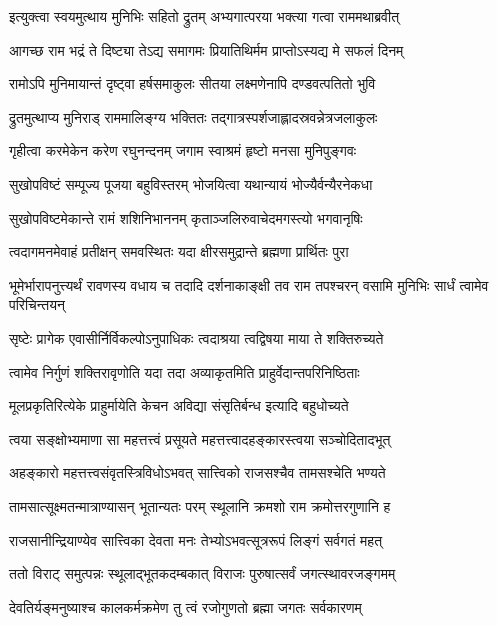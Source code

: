\twolineshloka
{इत्युक्त्वा स्वयमुत्थाय मुनिभिः सहितो द्रुतम्}
{अभ्यगात्परया भक्त्या गत्वा राममथाब्रवीत्} %

\twolineshloka
{आगच्छ राम भद्रं ते दिष्ट्या तेऽद्य समागमः}
{प्रियातिथिर्मम प्राप्तोऽस्यद्य मे सफलं दिनम्} %

\twolineshloka
{रामोऽपि मुनिमायान्तं दृष्ट्वा हर्षसमाकुलः}
{सीतया लक्ष्मणेनापि दण्डवत्पतितो भुवि} %

\twolineshloka
{द्रुतमुत्थाप्य मुनिराड् राममालिङ्ग्य भक्तितः}
{तद्गात्रस्पर्शजाह्लादस्रवन्नेत्रजलाकुलः} %

\twolineshloka
{गृहीत्वा करमेकेन करेण रघुनन्दनम्}
{जगाम स्वाश्रमं हृष्टो मनसा मुनिपुङ्गवः} %

\twolineshloka
{सुखोपविष्टं सम्पूज्य पूजया बहुविस्तरम्}
{भोजयित्वा यथान्यायं भोज्यैर्वन्यैरनेकधा} %

\twolineshloka
{सुखोपविष्टमेकान्ते रामं शशिनिभाननम्}
{कृताञ्जलिरुवाचेदमगस्त्यो भगवानृषिः} %

\twolineshloka
{त्वदागमनमेवाहं प्रतीक्षन् समवस्थितः}
{यदा क्षीरसमुद्रान्ते ब्रह्मणा प्रार्थितः पुरा} %

\threelineshloka
{भूमेर्भारापनुत्त्यर्थं रावणस्य वधाय च}
{तदादि दर्शनाकाङ्क्षी तव राम तपश्चरन्}
{वसामि मुनिभिः सार्धं त्वामेव परिचिन्तयन्} %

\twolineshloka
{सृष्टेः प्रागेक एवासीर्निर्विकल्पोऽनुपाधिकः}
{त्वदाश्रया त्वद्विषया माया ते शक्तिरुच्यते} %

\twolineshloka
{त्वामेव निर्गुणं शक्तिरावृणोति यदा तदा}
{अव्याकृतमिति प्राहुर्वेदान्तपरिनिष्ठिताः} %

\twolineshloka
{मूलप्रकृतिरित्येके प्राहुर्मायेति केचन}
{अविद्या संसृतिर्बन्ध इत्यादि बहुधोच्यते} %

\twolineshloka
{त्वया सङ्क्षोभ्यमाणा सा महत्तत्त्वं प्रसूयते}
{महत्तत्त्वादहङ्कारस्त्वया सञ्चोदितादभूत्} %

\twolineshloka
{अहङ्कारो महत्तत्त्वसंवृतस्त्रिविधोऽभवत्}
{सात्त्विको राजसश्चैव तामसश्चेति भण्यते} %

\twolineshloka
{तामसात्सूक्ष्मतन्मात्राण्यासन् भूतान्यतः परम्}
{स्थूलानि क्रमशो राम क्रमोत्तरगुणानि ह} %

\twolineshloka
{राजसानीन्द्रियाण्येव सात्त्विका देवता मनः}
{तेभ्योऽभवत्सूत्ररूपं लिङ्गं सर्वगतं महत्} %

\twolineshloka
{ततो विराट् समुत्पन्नः स्थूलाद्भूतकदम्बकात्}
{विराजः पुरुषात्सर्वं जगत्स्थावरजङ्गमम्} %

\twolineshloka
{देवतिर्यङ्मनुष्याश्च कालकर्मक्रमेण तु}
{त्वं रजोगुणतो ब्रह्मा जगतः सर्वकारणम्} %

